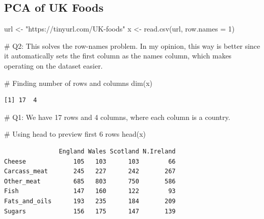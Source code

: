 \documentclass[
  letterpaper,
  DIV=11,
  numbers=noendperiod]{scrartcl}
\newenvironment{Shaded}{\begin{snugshade}}{\end{snugshade}}
\newcommand{\AttributeTok}[1]{\textcolor[rgb]{0.40,0.45,0.13}{#1}}
\newcommand{\CommentTok}[1]{\textcolor[rgb]{0.37,0.37,0.37}{#1}}
\newcommand{\DecValTok}[1]{\textcolor[rgb]{0.68,0.00,0.00}{#1}}
\newcommand{\FunctionTok}[1]{\textcolor[rgb]{0.28,0.35,0.67}{#1}}
\newcommand{\NormalTok}[1]{\textcolor[rgb]{0.00,0.23,0.31}{#1}}
\newcommand{\OtherTok}[1]{\textcolor[rgb]{0.00,0.23,0.31}{#1}}
\newcommand{\StringTok}[1]{\textcolor[rgb]{0.13,0.47,0.30}{#1}}
\begin{document}
\hypertarget{pca-of-uk-foods}{%
\subsection{PCA of UK Foods}\label{pca-of-uk-foods}}

\begin{Shaded}
\begin{Highlighting}[]
\NormalTok{url }\OtherTok{\textless{}{-}} \StringTok{"https://tinyurl.com/UK{-}foods"}
\NormalTok{x }\OtherTok{\textless{}{-}} \FunctionTok{read.csv}\NormalTok{(url, }\AttributeTok{row.names =} \DecValTok{1}\NormalTok{)}

\CommentTok{\# Q2: This solves the \textquotesingle{}row{-}names problem\textquotesingle{}. In my opinion, this way is better since it automatically sets the first column as the names column, which makes operating on the dataset easier.}
\end{Highlighting}
\end{Shaded}

\begin{Shaded}
\begin{Highlighting}[]
\CommentTok{\# Finding number of rows and columns}
\FunctionTok{dim}\NormalTok{(x)}
\end{Highlighting}
\end{Shaded}

\begin{verbatim}
[1] 17  4
\end{verbatim}

\begin{Shaded}
\begin{Highlighting}[]
\CommentTok{\# Q1: We have 17 rows and 4 columns, where each column is a country.}
\end{Highlighting}
\end{Shaded}

\begin{Shaded}
\begin{Highlighting}[]
\CommentTok{\# Using head to preview first 6 rows}
\FunctionTok{head}\NormalTok{(x)}
\end{Highlighting}
\end{Shaded}

\begin{verbatim}
               England Wales Scotland N.Ireland
Cheese             105   103      103        66
Carcass_meat       245   227      242       267
Other_meat         685   803      750       586
Fish               147   160      122        93
Fats_and_oils      193   235      184       209
Sugars             156   175      147       139
\end{verbatim}
\end{document}
